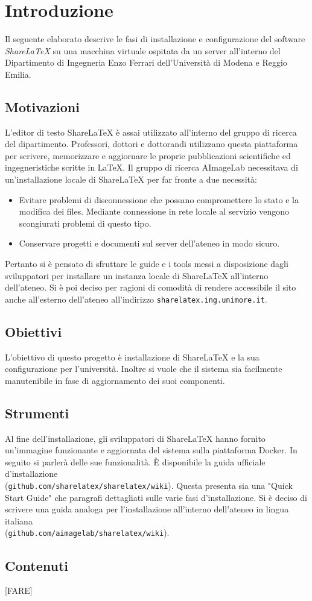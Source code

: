 \chapter{Introduzione}
\label{Introduzione}
\thispagestyle{empty}

Il seguente elaborato descrive le fasi di installazione e configurazione del software \emph{ShareLaTeX} su una macchina virtuale ospitata da un server all'interno del Dipartimento di Ingegneria Enzo Ferrari dell'Università di Modena e Reggio Emilia.

\section{Motivazioni}
L'editor di testo ShareLaTeX è assai utilizzato all'interno del gruppo di ricerca del dipartimento. Professori, dottori e dottorandi utilizzano questa piattaforma per scrivere, memorizzare e aggiornare le proprie pubblicazioni scientifiche ed ingegneristiche scritte in \LaTeX. Il gruppo di ricerca AImageLab necessitava di un'installazione locale di ShareLaTeX per far fronte a due necessità:
\begin{itemize}
    \item Evitare problemi di disconnessione che possano compromettere lo stato e la modifica dei files. Mediante connessione in rete locale al servizio vengono scongiurati problemi di questo tipo.
    \item Conservare progetti e documenti sul server dell'ateneo in modo sicuro.
\end{itemize}
Pertanto si è pensato di sfruttare le guide e i tools messi a disposizione dagli sviluppatori per installare un instanza locale di ShareLaTeX all'interno dell'ateneo. Si è poi deciso per ragioni di comodità di rendere accessibile il sito anche all'esterno dell'ateneo all'indirizzo \verb|sharelatex.ing.unimore.it|.

\section{Obiettivi}
L'obiettivo di questo progetto è installazione di ShareLaTeX e la sua configurazione per l'università. Inoltre si vuole che il sistema sia facilmente manutenibile in fase di aggiornamento dei suoi componenti.

\section{Strumenti}
Al fine dell'installazione, gli sviluppatori di ShareLaTeX hanno fornito un'immagine funzionante e aggiornata del sistema sulla piattaforma Docker. In seguito si parlerà delle sue funzionalità. È disponibile la guida ufficiale d'installazione\\(\verb|github.com/sharelatex/sharelatex/wiki|). Questa presenta sia una "Quick Start Guide" che paragrafi dettagliati sulle varie fasi d'installazione. Si è deciso di scrivere una guida analoga per l'installazione all'interno dell'ateneo in lingua italiana\\(\verb|github.com/aimagelab/sharelatex/wiki|).

\section{Contenuti}
\huge [FARE]
\normalsize

